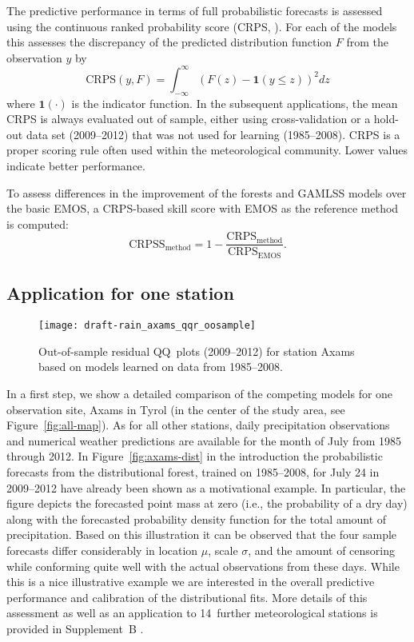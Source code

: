 \documentclass[aoas, preprint]{imsart}
\numberwithin{equation}{subsection}
\begin{document}
The predictive performance in terms of full probabilistic forecasts is
assessed using the continuous ranked probability score (CRPS, \citealp{Hersbach:2000}).
For each of the models this assesses the discrepancy of the
predicted distribution function $F$ from the observation $y$ by
\begin{equation}
\text{CRPS}(y, F) = \int_{-\infty}^\infty (F(z) - \mathbf{1}(y \leq z))^2 dz
\end{equation}
where \(\mathbf{1}(\cdot)\) is the indicator function. In the subsequent
applications, the mean CRPS is always evaluated out of sample, 
either using cross-validation or a hold-out data set (2009--2012)
that was not used for learning (1985--2008). CRPS is a proper scoring rule
\citep{Gneiting+Raftery:2007} often used within the meteorological community.
Lower values indicate better performance.

To assess differences in the improvement of the forests and GAMLSS
models over the basic EMOS, a CRPS-based skill score with EMOS as
the reference method is computed:
\begin{equation}
\text{CRPSS}_{\text{method}} = 1 - \frac{\text{CRPS}_{\text{method}}}{\text{CRPS}_{\text{EMOS}}}.
\end{equation}




\subsection{Application for one station}
\label{sec:axams}

\begin{figure}[t!]
\centering
{}
\texttt{[image: draft-rain\_axams\_qqr\_oosample]}
\caption{\label{fig:axams-qq} Out-of-sample residual QQ~plots (2009--2012) 
for station Axams based on models learned on data from 1985--2008.}
\end{figure}

In a first step, we show a detailed comparison of the competing models
for one observation site, Axams in Tyrol (in the center of the study area,
see Figure~\ref{fig:all-map}). As for all other stations, daily precipitation 
observations and numerical weather predictions are available for the month of July 
from 1985 through 2012. In Figure~\ref{fig:axams-dist} in the introduction the 
probabilistic forecasts from the distributional forest, trained on 1985--2008, 
for July 24 in 2009--2012 have already been shown as a motivational example. 
In particular, the figure depicts the forecasted point mass at zero
(i.e., the probability of a dry day) along with the forecasted probability 
density function for the total amount of precipitation. Based on this illustration 
it can be observed that the four sample forecasts differ considerably in 
location $\mu$, scale $\sigma$, and the amount of censoring while conforming quite 
well with the actual observations from these days. 
While this is a nice illustrative example we are  
interested in the overall predictive performance and calibration of the
distributional fits. More details of this assessment as well as
an application to 14~further meteorological stations is provided in
Supplement~B \citep{Schlosser+Hothorn+Stauffer:2019b}.
\end{document}
